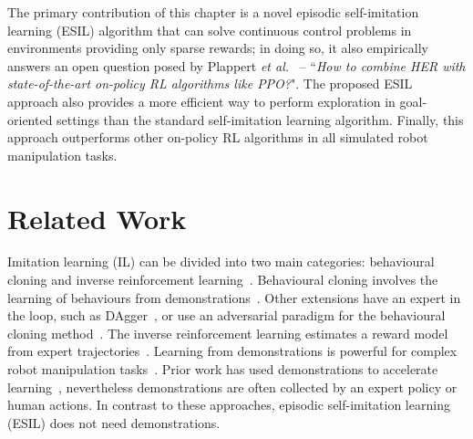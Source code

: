 The primary contribution of this chapter is a novel episodic self-imitation learning (ESIL) algorithm that can solve continuous control problems {in environments providing only sparse rewards}; in doing so, it also empirically answers an open question posed by Plappert \textit{et al.}~\cite{plappert2018multi} -- ``\textit{How to combine HER with state-of-the-art on-policy RL algorithms like
PPO?}". {The proposed ESIL approach also provides} a more efficient way to perform exploration in goal-oriented settings than the standard self-imitation learning algorithm. 
Finally, this approach outperforms other on-policy RL algorithms in all simulated robot manipulation tasks.

\section{Related Work}
Imitation learning (IL) can be divided into two main categories: behavioural cloning and inverse reinforcement learning~\cite{hussein2017imitation}. Behavioural cloning involves the learning of behaviours from demonstrations~\cite{bojarski2016end,xu2017end,torabi2018behavioral}. Other extensions have an expert in the loop, such as DAgger~\cite{ross2011reduction}, or use an adversarial paradigm for the behavioural cloning method~\cite{ho2016generative,wang2017robust}. The inverse reinforcement learning estimates a reward model from expert trajectories~\cite{ng2000algorithms,abbeel2004apprenticeship,ziebart2008maximum}. Learning from demonstrations is powerful for complex robot manipulation tasks~\cite{finn2016guided,zhang2018deep,pmlr-v78-finn17a,rajeswaran2017learning,fang2019survey}. Prior work has used demonstrations to accelerate  learning~\cite{rajeswaran2017learning,vevcerik2017leveraging,nair2018overcoming},  nevertheless demonstrations are often collected by an expert policy or human actions. In contrast to these approaches, {episodic self-imitation learning (ESIL) does not need demonstrations.}

